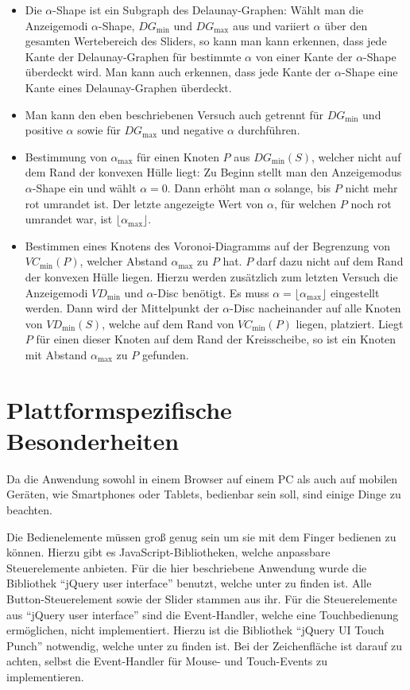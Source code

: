 \begin{itemize}
\item Die $\alpha$-Shape ist ein Subgraph des Delaunay-Graphen: Wählt man die Anzeigemodi $\alpha$-Shape, $DG_{\min}$ und $DG_{\max}$ aus und variiert $\alpha$ über den gesamten Wertebereich des Sliders, so kann man kann erkennen, dass jede Kante der Delaunay-Graphen für bestimmte $\alpha$ von einer Kante der $\alpha$-Shape überdeckt wird. Man kann auch erkennen, dass jede Kante der $\alpha$-Shape eine Kante eines Delaunay-Graphen überdeckt.

\item Man kann den eben beschriebenen Versuch auch getrennt für $DG_{\min}$ und positive $\alpha$ sowie für $DG_{\max}$ und negative $\alpha$ durchführen.

\item Bestimmung von $\alpha_{\max}$ für einen Knoten $P$ aus $DG_{\min}(S)$, welcher nicht auf dem Rand der konvexen Hülle liegt: Zu Beginn stellt man den Anzeigemodus $\alpha$-Shape ein und wählt $\alpha = 0$. Dann erhöht man $\alpha$ solange, bis $P$ nicht mehr rot umrandet ist. Der letzte angezeigte Wert von $\alpha$, für welchen $P$ noch rot umrandet war, ist $\lfloor \alpha_{\max} \rfloor$.

\item Bestimmen eines Knotens des Voronoi-Diagramms auf der Begrenzung von $VC_{\min}(P)$, welcher Abstand $\alpha_{\max}$ zu $P$ hat. $P$ darf dazu nicht auf dem Rand der konvexen Hülle liegen.  Hierzu werden zusätzlich zum letzten Versuch die Anzeigemodi $VD_{\min}$ und $\alpha$-Disc benötigt. Es muss $\alpha = \lfloor \alpha_{\max} \rfloor$ eingestellt werden. Dann wird der Mittelpunkt der $\alpha$-Disc nacheinander auf alle Knoten von $VD_{\min}(S)$, welche auf dem Rand von $VC_{\min}(P)$ liegen, platziert. Liegt $P$ für einen dieser Knoten auf dem Rand der Kreisscheibe, so ist ein Knoten mit Abstand $\alpha_{\max}$ zu $P$ gefunden.
\end{itemize} 

\section{Plattformspezifische Besonderheiten}

Da die Anwendung sowohl in einem Browser auf einem PC als auch auf mobilen Geräten, wie Smartphones oder Tablets, bedienbar sein soll, sind einige Dinge zu beachten.

Die Bedienelemente müssen groß genug sein um sie mit dem Finger bedienen zu können. Hierzu gibt es JavaScript-Bibliotheken, welche anpassbare Steuerelemente anbieten. Für die hier beschriebene Anwendung wurde die Bibliothek "`jQuery user interface"' benutzt, welche unter \autocite{jqueryui} zu finden ist. Alle Button-Steuerelement sowie der Slider stammen aus ihr. Für die Steuerelemente aus "`jQuery user interface"' sind die Event-Handler, welche eine Touchbedienung ermöglichen, nicht implementiert. Hierzu ist die Bibliothek "`jQuery UI Touch Punch"' notwendig, welche unter \autocite{jqueryuitouch} zu finden ist. Bei der Zeichenfläche ist darauf zu achten, selbst die Event-Handler für Mouse- und Touch-Events zu implementieren.

